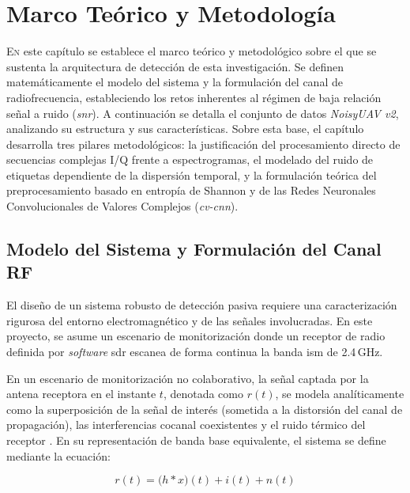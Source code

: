 \chapter{Marco Teórico y Metodología}
\label{cap:MarcoTeorico}


\lettrine[lraise=-0.1, lines=2, loversize=0.2]{E}{n} este capítulo se establece el marco teórico y metodológico sobre el que se sustenta la arquitectura de detección de esta investigación. Se definen matemáticamente el modelo del sistema y la formulación del canal de radiofrecuencia, estableciendo los retos inherentes al régimen de baja relación señal a ruido (\textit{\gls{snr}}). A continuación se detalla el conjunto de datos \textit{NoisyUAV v2}, analizando su estructura y sus características. Sobre esta base, el capítulo desarrolla tres pilares metodológicos: la justificación del procesamiento directo de secuencias complejas I/Q frente a espectrogramas, el modelado del ruido de etiquetas dependiente de la dispersión temporal, y la formulación teórica del preprocesamiento basado en entropía de Shannon y de las Redes Neuronales Convolucionales de Valores Complejos (\textit{\gls{cv-cnn}}).

\section{Modelo del Sistema y Formulación del Canal RF}
\label{sec:modelo_sistema}
El diseño de un sistema robusto de detección pasiva requiere una caracterización rigurosa del entorno electromagnético y de las señales involucradas. En este proyecto, se asume un escenario de monitorización donde un receptor de radio definida por \textit{software} \gls{sdr} escanea de forma continua la banda {\gls{ism}} de 2.4\,GHz.

En un escenario de monitorización no colaborativo, la señal captada por la antena receptora en el instante $t$, denotada como $r(t)$, se modela analíticamente como la superposición de la señal de interés (sometida a la distorsión del canal de propagación), las interferencias cocanal coexistentes y el ruido térmico del receptor \cite{rout_novel_2025, ezuma_detection_2020}. En su representación de banda base equivalente, el sistema se define mediante la ecuación:

\begin{equation}
 r(t) = \big(h * x\big)(t) + i(t) + n(t)    
 \label{eq:modelo_sistema}
\end{equation}

